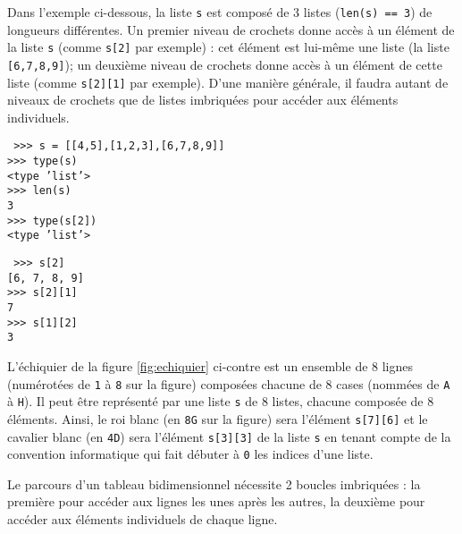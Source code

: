 Dans l'exemple ci-dessous, la liste {\tt s} est composé de 3 listes ({\tt len(s) == 3})
de longueurs différentes.
Un premier niveau de crochets donne accès à un élément de la liste {\tt s} (comme {\tt s[2]}
par exemple) : cet élément est lui-même une liste (la liste {\tt [6,7,8,9]}); 
un deuxième niveau de crochets donne accès 
à un élément de cette liste (comme {\tt s[2][1]} par exemple). D'une manière générale, il faudra
autant de niveaux de crochets que de listes imbriquées pour accéder aux éléments individuels.

\noindent\mbox{}\hspace*{1cm}\begin{py}{6.5cm}\tt
>>> s = [[4,5],[1,2,3],[6,7,8,9]]\\
>>> type(s)\\
<type 'list'>\\
>>> len(s)\\
3\\
>>> type(s[2])\\
<type 'list'>
\end{py}
\hfill
\begin{py}{6.5cm}\tt
>>> s[2]\\
\mbox{}[6, 7, 8, 9]\\
>>> s[2][1]\\
7\\
>>> s[1][2]\\
3
\end{py}
\vspace*{2mm}

\begin{ex}[Echiquier]\label{ex:echiquier}
L'échiquier de la figure \ref{fig:echiquier} ci-contre est
un ensemble de 8 lignes (numérotées de {\tt 1} à {\tt 8} sur la figure) composées
chacune de 8 cases (nommées de {\tt A} à {\tt H}).
Il peut être représenté par une liste {\tt s} de 8 listes, chacune composée de 8 éléments.
Ainsi, le roi blanc (en {\tt 8G} sur la figure) sera l'élément {\tt s[7][6]} et le 
cavalier blanc (en {\tt 4D}) sera l'élément {\tt s[3][3]} de la liste {\tt s}
en tenant compte de la convention informatique qui fait débuter à {\tt 0} les indices d'une 
liste.
\end{ex}

Le parcours d'un tableau bidimensionnel nécessite
2 boucles imbriquées : la première pour accéder aux lignes les unes après les autres,
la deuxième pour accéder aux éléments individuels de chaque ligne.

